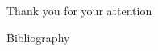\documentclass{beamer}
\begin{document}

\section*{}

\begin{frame}{}
    \begin{center}
        Thank you for your attention
    \end{center}
\end{frame}




  \begin{frame}[noframenumbering]{Bibliography}

  
  

  \end{frame}
\end{document}
